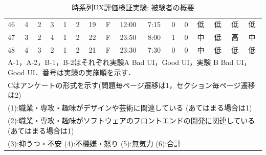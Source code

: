 \begin{table}[htbp]
{\begin{tabular}{llllllllllllllll}
46                  & 4                    & 2                    & 3                    & 1                    & 2                  & 19                     & F                   & 12:00                 & 7:15                  & 0                    & 0                    & 低     & 低     & 低     & 低     \\
47                  & 3                    & 2                    & 4                    & 1                    & 2                  & 22                     & F                   & 23:50                 & 8:00                  & 1                    & 0                    & 中     & 低     & 高     & 中     \\
48                  & 4                    & 3                    & 2                    & 1                    & 2                  & 21                     & F                   & 23:30                 & 7:30                  & 0                    & 0                    & 中     & 低     & 低     & 低     \\ \hline
\multicolumn{16}{l}{A-1，A-2，B-1，B-2はそれぞれ実験A Bad UI，Good UI，実験 B Bad UI，Good UI．番号は実験の実施順を示す．}                                                                                                                                                                                                                     \\
\multicolumn{16}{l}{Cはアンケートの形式を示す(問題毎ページ遷移は1，セクション毎ページ遷移は2)}                                                                                                                                                                                                                                                      \\
\multicolumn{16}{l}{(1):職業・専攻・趣味がデザインや芸術に関連している (あてはまる場合は1)}                                                                                                                                                                                                                                                      \\
\multicolumn{16}{l}{(2):職業・専攻・趣味がソフトウェアのフロントエンドの開発に関連している(あてはまる場合は1)}                                                                                                                                                                                                                                             \\
\multicolumn{16}{l}{(3):抑うつ・不安 (4):不機嫌・怒り (5):無気力 (6):合計}                                                                                                                                                                                                                                                        
\end{tabular}
}
\caption{時系列UX評価検証実験: 被験者の概要}
\label{table:exp2result1}
\end{table}


